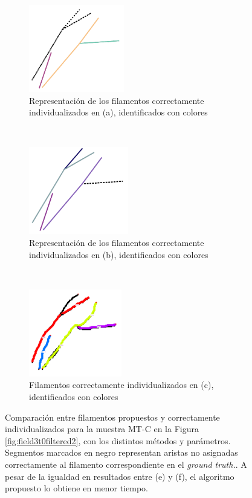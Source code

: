 \begin{figure}[h!]
    \begin{subfigure}[t]{0.3\textwidth}
        \centering
        \includegraphics[height=1.5in]{resultImages/field3-t0-2cellBcrop-filtered-2-DeFiNeExactMatch-30.png}
        \caption{Representaci\'on de los filamentos correctamente individualizados en (a), identificados con colores}
        \label{fig:field3t0filtered2Results-d}
    \end{subfigure}%
    ~ 
    \begin{subfigure}[t]{0.3\textwidth}
        \centering
        \includegraphics[height=1.5in]{resultImages/field3-t0-2cellBcrop-filtered-2-DeFiNeExactMatch-60.png}
        \caption{Representaci\'on de los filamentos correctamente individualizados en (b), identificados con colores}
        \label{fig:field3t0filtered2Results-e}
    \end{subfigure}
    ~ 
    \begin{subfigure}[t]{0.3\textwidth}
        \centering
        \includegraphics[height=1.5in]{resultImages/field3-t0-2cellBcrop-filtered-2-phil-s1271-v05-exactMatch-antLabeled.png}
        \caption{Filamentos correctamente individualizados en (c), identificados con colores}
        \label{fig:field3t0filtered2Results-f}
    \end{subfigure}
    
    \caption{Comparaci\'on entre filamentos propuestos y correctamente individualizados para la muestra MT-C en la Figura \ref{fig:field3t0filtered2}, con los distintos m\'etodos y par\'ametros. Segmentos marcados en negro representan aristas no asignadas correctamente al filamento correspondiente en el {\it ground truth.}. A pesar de la igualdad en resultados entre (e) y (f), el algoritmo propuesto lo obtiene en menor tiempo.}
    \label{fig:field3t0filtered2Results}
\end{figure}

